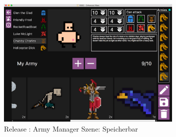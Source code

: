 \documentclass[12pt, titlepage]{scrartcl}
\newcommand{\RN}[1]{%
	\textup{\uppercase\expandafter{\romannumeral#1}}%
}
\begin{document}
                \begin{figure}[H] 
    				\centering
    				\includegraphics[width=0.8\textwidth]{images/old_state/army_manager/ArmyReadyToSave.png}
    				\caption{Release \RN{2}: Army Manager Szene: Speicherbar}
    				\label{Army_Manager_Ready_To_Save}
			    \end{figure}
\end{document}
